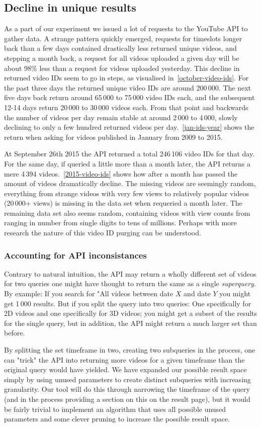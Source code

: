 \subsection{Decline in unique results}
As a part of our experiment we issued a lot of requests to the YouTube API to
gather data. A strange pattern quickly emerged, requests for timeslots longer
back than a few days contained drastically less returned unique videos, and 
stepping a month back, a request for all videos uploaded a given day will be 
about 98\% less than a request for videos uploaded yesterday. This decline in
returned video IDs seem to go in steps, as visualised
in~\cref{october-video-ids}. For the past three days the returned unique video
IDs are around 200\,000. The next five days back return around 65\,000 to 
75\,000 video IDs each, and the subsequent 12-14 days return 20\,000 to 30\,000
videos each. From that point and backwards the number of videos per day remain
stable at around 2\,000 to 4\,000, slowly declining to only a few hundred
returned videos per day.~\cref{jan-ids-year} shows the return when asking for 
videos published in January from 2009 to 2015. 

At September 26th 2015 the API returned a total 246\,106 video IDs for that day.
For the same day, if queried a little more than a month later, the API returns
a mere 4\,394 videos.~\cref{2015-video-ids} shows how after a month has passed 
the amount of videos dramatically decline. The missing videos are seemingly 
random, everything from strange videos with very few views to relatively popular
videos (20\,000+ views) is missing in the data set when requeried a month later. 
The remaining data set also seems random, containing videos with view counts 
from ranging in number from single digits to tens of millions. Perhaps with more research the
nature of this video ID purging can be understood.

\subsubsection{Accounting for API inconsistances}
Contrary to natural intuition, the API may return a wholly different set of
videos for two queries one might have thought to return the same as a single
\textit{superquery}. By example: If you search for "All videos between date
$X$ and date $Y$ you might get 1\,000 results. But if you split the query into
two queries: One specifically for 2D videos and one specifically for 3D videos;
you might get a subset of the results for the single query, but in addition,
the API might return a much larger set than before.

By splitting the set timeframe in two, creating two subqueries in the process,
one can "trick"
the API into returning more videos for a given
timeframe than the original query would have yielded. We have expanded our
possible result space simply by using unused parameters to create distinct
subqueries with increasing granularity.
Our tool will do this through narrowing the timeframe of the query (and
in the process providing a section on this on the result page), but
it would be fairly trivial to implement an algorithm that uses all possible
unused parameters and some clever pruning to increase the possible result space.

